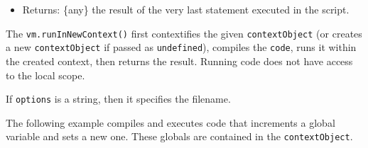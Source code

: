 \begin{itemize}
\begin{itemize}
    \begin{itemize}
    \tightlist
    \item
      \texttt{specifier} \{string\} specifier passed to
      \texttt{import()}
    \item
      \texttt{script} \{vm.Script\}
    \item
      \texttt{importAttributes} \{Object\} The \texttt{"with"} value
      passed to the
      \href{https://tc39.es/proposal-import-attributes/\#sec-evaluate-import-call}{\texttt{optionsExpression}}
      optional parameter, or an empty object if no value was provided.
    \item
      Returns: \{Module Namespace Object\textbar vm.Module\} Returning a
      \texttt{vm.Module} is recommended in order to take advantage of
      error tracking, and to avoid issues with namespaces that contain
      \texttt{then} function exports.
    \end{itemize}
  \item
    \texttt{microtaskMode} \{string\} If set to \texttt{afterEvaluate},
    microtasks (tasks scheduled through \texttt{Promise}s and
    \texttt{async\ function}s) will be run immediately after the script
    has run. They are included in the \texttt{timeout} and
    \texttt{breakOnSigint} scopes in that case.
  \end{itemize}
\item
  Returns: \{any\} the result of the very last statement executed in the
  script.
\end{itemize}

The \texttt{vm.runInNewContext()} first contextifies the given
\texttt{contextObject} (or creates a new \texttt{contextObject} if
passed as \texttt{undefined}), compiles the \texttt{code}, runs it
within the created context, then returns the result. Running code does
not have access to the local scope.

If \texttt{options} is a string, then it specifies the filename.

The following example compiles and executes code that increments a
global variable and sets a new one. These globals are contained in the
\texttt{contextObject}.

